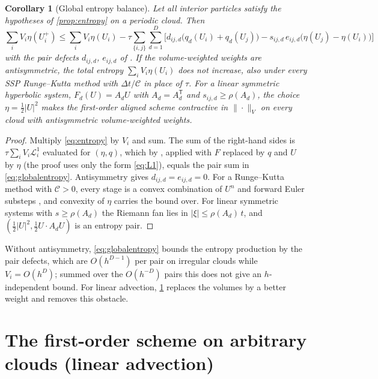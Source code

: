 \documentclass[11pt,a4paper]{article}
\theoremstyle{plain}
\newtheorem{corollary}[theorem]{Corollary}
\theoremstyle{definition}
\theoremstyle{remark}
\numberwithin{equation}{section}
\newcommand{\Lop}{\mathcal{L}}
\newcommand{\Csp}{\mathcal{C}}
\newcommand{\A}[1]{\cite[#1]{Addendum}}
\begin{document}
\begin{corollary}[Global entropy balance]\label{cor:entropy}
Let all interior particles satisfy the hypotheses of \cref{prop:entropy} on a periodic cloud. Then
\begin{equation}\label{eq:globalentropy}
\sum_iV_i\eta(U^+_i)\le\sum_iV_i\eta(U_i)-\tau\sum_{\{i,j\}}\sum_{d=1}^D\Big[d_{ij,d}\big(q_d(U_i)+q_d(U_j)\big)-s_{ij,d}\,e_{ij,d}\big(\eta(U_j)-\eta(U_i)\big)\Big]
\end{equation}
with the pair defects $d_{ij,d}$, $e_{ij,d}$ of \A{Prop.~4.4}. If the volume-weighted weights are antisymmetric, the total entropy $\sum_iV_i\eta(U_i)$ does not increase, also under every SSP Runge--Kutta method with $\Delta t/\Csp$ in place of $\tau$. For a linear symmetric hyperbolic system, $F_d(U)=A_dU$ with $A_d=A_d^{\mathsf T}$ and $s_{ij,d}\ge\rho(A_d)$, the choice $\eta=\tfrac12|U|^2$ makes the first-order aligned scheme contractive in $\|\cdot\|_V$ on every cloud with antisymmetric volume-weighted weights.
\end{corollary}

\begin{proof}
Multiply \eqref{eq:entropy} by $V_i$ and sum. The sum of the right-hand sides is $\tau\sum_iV_i\Lop^1_i$ evaluated for $(\eta,q)$, which by \A{Prop.~4.4}, applied with $F$ replaced by $q$ and $U$ by $\eta$ (the proof uses only the form \eqref{eq:L1}), equals the pair sum in \eqref{eq:globalentropy}. Antisymmetry gives $d_{ij,d}=e_{ij,d}=0$. For a Runge--Kutta method with $\Csp>0$, every stage is a convex combination of $U^n$ and forward Euler substeps \A{Lem.~6.1}, and convexity of $\eta$ carries the bound over. For linear symmetric systems with $s\ge\rho(A_d)$ the Riemann fan lies in $|\xi|\le\rho(A_d)\,t$, and $(\tfrac12|U|^2,\tfrac12U\cdot A_dU)$ is an entropy pair.
\end{proof}

Without antisymmetry, \eqref{eq:globalentropy} bounds the entropy production by the pair defects, which are $O(h^{D-1})$ per pair on irregular clouds while $V_i=O(h^D)$; summed over the $O(h^{-D})$ pairs this does not give an $h$-independent bound. For linear advection, \cref{sec:markov} replaces the volumes by a better weight and removes this obstacle.

\section{The first-order scheme on arbitrary clouds (linear advection)}\label{sec:markov}
\end{document}

